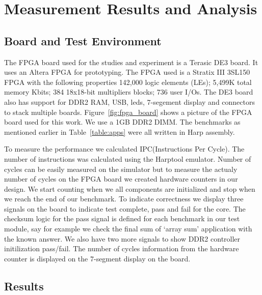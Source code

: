 \setcounter{equation}{0}
 
\chapter{Measurement Results and Analysis}
\label{chap: Simulation Results }
\section{Board and Test Environment}

The FPGA board used for the studies and experiment is a Terasic DE3 board. It uses an Altera FPGA for prototyping. The FPGA used is a Stratix III 3SL150 FPGA with the following properties 142,000 logic elements (LEs); 5,499K total memory Kbits; 384 18x18-bit multipliers blocks; 736 user I/Os. The DE3 board also has support for DDR2 RAM, USB, leds, 7-segement display and connectors to stack multiple boards. Figure~\ref{fig:fpga_board} shows a picture of the FPGA board used for this work. We use a 1GB DDR2 DIMM. The benchmarks as mentioned earlier in Table~\ref{table:apps} were all written in Harp assembly.

To measure the performance we calculated IPC(Instructions Per Cycle). The number of instructions was calculated using the Harptool emulator. Number of cycles can be easily measured on the simulator but to measure the actualy number of cycles on the FPGA board we created hardware counters in our design. We start counting when we all components are initialized and stop when we reach the end of our benchmark. To indicate correctness we display three signals on the board to indicate test complete, pass and fail for the core. The checksum logic for the pass signal is defined for each benchmark in our test module, say for example we check the final sum of `array sum' application with the known answer. We also have two more signals to show DDR2 controller initilization pass/fail. The number of cycles information from the hardware counter is displayed on the 7-segment display on the board.
\section{Results}


